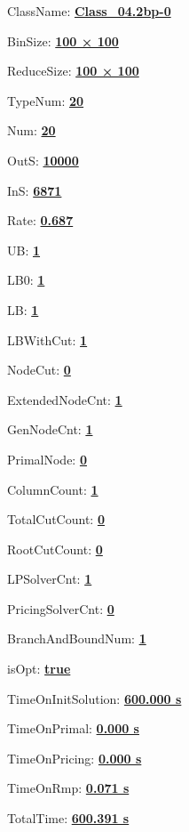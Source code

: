 \documentclass[11pt]{article}
\begin{document}
\pagestyle{empty}


ClassName: \underline{\textbf{Class_04.2bp-0}}
\par
BinSize: \underline{\textbf{100 × 100}}
\par
ReduceSize: \underline{\textbf{100 × 100}}
\par
TypeNum: \underline{\textbf{20}}
\par
Num: \underline{\textbf{20}}
\par
OutS: \underline{\textbf{10000}}
\par
InS: \underline{\textbf{6871}}
\par
Rate: \underline{\textbf{0.687}}
\par
UB: \underline{\textbf{1}}
\par
LB0: \underline{\textbf{1}}
\par
LB: \underline{\textbf{1}}
\par
LBWithCut: \underline{\textbf{1}}
\par
NodeCut: \underline{\textbf{0}}
\par
ExtendedNodeCnt: \underline{\textbf{1}}
\par
GenNodeCnt: \underline{\textbf{1}}
\par
PrimalNode: \underline{\textbf{0}}
\par
ColumnCount: \underline{\textbf{1}}
\par
TotalCutCount: \underline{\textbf{0}}
\par
RootCutCount: \underline{\textbf{0}}
\par
LPSolverCnt: \underline{\textbf{1}}
\par
PricingSolverCnt: \underline{\textbf{0}}
\par
BranchAndBoundNum: \underline{\textbf{1}}
\par
isOpt: \underline{\textbf{true}}
\par
TimeOnInitSolution: \underline{\textbf{600.000 s}}
\par
TimeOnPrimal: \underline{\textbf{0.000 s}}
\par
TimeOnPricing: \underline{\textbf{0.000 s}}
\par
TimeOnRmp: \underline{\textbf{0.071 s}}
\par
TotalTime: \underline{\textbf{600.391 s}}
\par
\newpage
\end{document}
